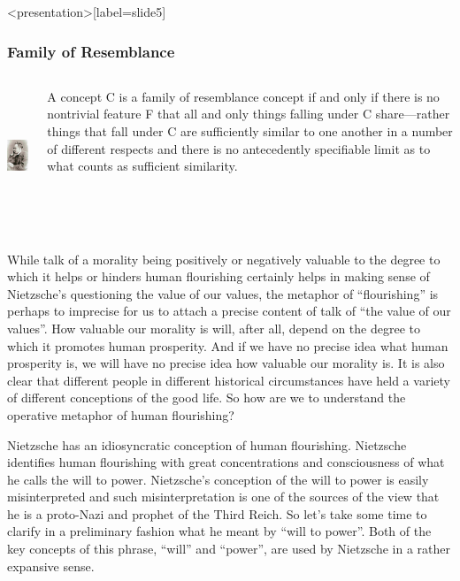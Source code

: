 \begin{frame}<presentation>[label=slide5]
    \frametitle{Family of Resemblance}
        \begin{columns}
            \begin{column}{3cm}
                \includegraphics[height=4cm]{../../../graphics/nietzsche.jpg}
            \end{column}
            \begin{column}{7cm}
                A concept \alert{C} is a family of resemblance concept if and only if there is no nontrivial feature \alert{F} that all and only things falling under \alert{C} share---rather things that fall under \alert{C} are sufficiently similar to one another in a number of different respects and there is no antecedently specifiable limit as to what counts as sufficient similarity.
            \end{column}
        \end{columns}
\end{frame}

While talk of a morality being positively or negatively valuable to the degree to which it helps or hinders human flourishing certainly helps in making sense of Nietzsche's questioning the value of our values, the metaphor of ``flourishing'' is perhaps to imprecise for us to attach a precise content of talk of ``the value of our values''. How valuable our morality is will, after all, depend on the degree to which it promotes human prosperity. And if we have no precise idea what human prosperity is, we will have no precise idea how valuable our morality is. It is also clear that different people in different historical circumstances have held a variety of different conceptions of the good life. So how are we to understand the operative metaphor of human flourishing?

Nietzsche has an idiosyncratic conception of human flourishing. Nietzsche identifies human flourishing with great concentrations and consciousness of what he calls the will to power. Nietzsche's conception of the will to power is easily misinterpreted and such misinterpretation is one of the sources of the view that he is a proto-Nazi and prophet of the Third Reich. So let's take some time to clarify in a preliminary fashion what he meant by ``will to power''. Both of the key concepts of this phrase, ``will'' and ``power'', are used by Nietzsche in a rather expansive sense.

